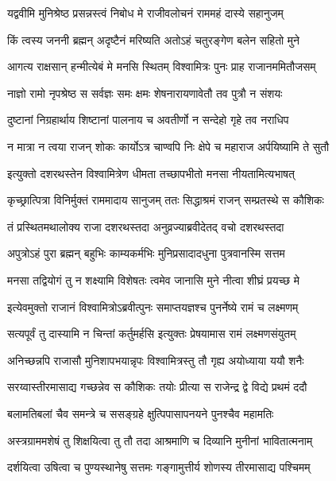 \twolineshloka
{यद्ववीमि मुनिश्रेष्ठ प्रसन्नस्त्वं निबोध मे}
{राजीवलोचनं राममहं दास्ये सहानुजम्} %

\twolineshloka
{किं त्वस्य जननी ब्रह्मन् अदृष्टैनं मरिष्यति}
{अतोऽहं चतुरङ्गेण बलेन सहितो मुने} %

\twolineshloka
{आगत्य राक्षसान् हन्मीत्येबं मे मनसि स्थितम्}
{विश्वामित्रः पुनः प्राह राजानममितौजसम्} %

\twolineshloka
{नाज्ञो रामो नृपश्रेष्ठ स सर्वज्ञः समः क्षमः}
{शेषनारायणावेतौ तव पुत्रौ न संशयः} %

\twolineshloka
{दुष्टानां निग्रहार्थाय शिष्टानां पालनाय च}
{अवतीर्णो न सन्देहो गृहे तव नराधिप} %

\twolineshloka
{न मात्रा न त्वया राजन् शोकः कार्योऽत्र चाण्वपि}
{निः क्षेपे च महाराज अर्पयिष्यामि ते सुतौ} %

\twolineshloka
{इत्युक्तो दशरथस्तेन विश्वामित्रेण धीमता}
{तच्छापभीतो मनसा नीयतामित्यभाषत्} %

\twolineshloka
{कृच्छ्रात्पित्रा विनिर्मुक्तं राममादाय सानुजम्}
{ततः सिद्धाश्रमं राजन् सम्प्रतस्थे स कौशिकः} %

\twolineshloka
{तं प्रस्थितमथालोक्य राजा दशरथस्तदा}
{अनुव्रज्याब्रवीदेतद् वचो दशरथस्तदा} %

\twolineshloka
{अपुत्रोऽहं पुरा ब्रह्मन् बहुभिः काम्यकर्मभिः}
{मुनिप्रसादादधुना पुत्रवानस्मि सत्तम} %

\twolineshloka
{मनसा तद्वियोगं तु न शक्ष्यामि विशेषतः}
{त्वमेव जानासि मुने नीत्वा शीघ्रं प्रयच्छ मे} %

\twolineshloka
{इत्येवमुक्तो राजानं विश्वामित्रोऽब्रवीत्पुनः}
{समाप्तयज्ञश्च पुनर्नेष्ये रामं च लक्ष्मणम्} %

\twolineshloka
{सत्यपूर्वं तु दास्यामि न चिन्तां कर्तुमर्हसि}
{इत्युक्तः प्रेषयामास रामं लक्ष्मणसंयुतम्} %

\twolineshloka
{अनिच्छन्नपि राजासौ मुनिशापभयान्नृपः}
{विश्वामित्रस्तु तौ गृह्य अयोध्याया ययौ शनैः} %

\twolineshloka
{सरय्वास्तीरमासाद्य गच्छन्नेव स कौशिकः}
{तयोः प्रीत्या स राजेन्द्र द्वे विद्ये प्रथमं ददौ} %

\twolineshloka
{बलामतिबलां चैव समन्त्रे च ससङ्ग्रहे}
{क्षुत्पिपासापनयने पुनश्चैव महामतिः} %

\twolineshloka
{अस्त्रग्राममशेषं तु शिक्षयित्वा तु तौ तदा}
{आश्रमाणि च दिव्यानि मुनीनां भावितात्मनाम्} %

\twolineshloka
{दर्शयित्वा उषित्वा च पुण्यस्थानेषु सत्तमः}
{गङ्गामुत्तीर्य शोणस्य तीरमासाद्य पश्चिमम्} %

